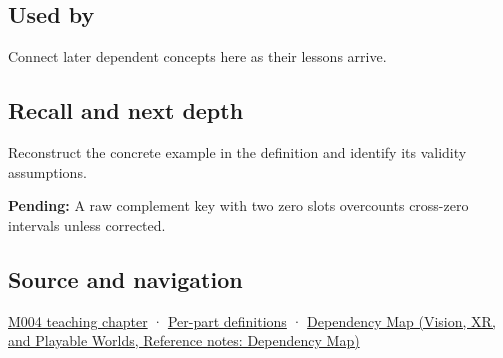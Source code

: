 \subsection{Used by}\label{appendix-deca299ae4b8-used-by}

\hypertarget{appendix-deca299ae4b8-used-by}{}

Connect later dependent concepts here as their lessons arrive.

\subsection{Recall and next depth}\label{appendix-deca299ae4b8-recall-and-next-depth}

\hypertarget{appendix-deca299ae4b8-recall-and-next-depth}{}

Reconstruct the concrete example in the definition and identify its validity assumptions.

\textbf{Pending:} A raw complement key with two zero slots overcounts cross-zero intervals unless corrected.

\subsection{Source and navigation}\label{appendix-deca299ae4b8-source-and-navigation}

\hypertarget{appendix-deca299ae4b8-source-and-navigation}{}

\hyperref[01-foundations-i-ch001-a-stretching-ruler-for-real-valued-quantities]{M004 teaching chapter} · \hyperref[appendix-fd090d982a15-m004---parts-61-76]{Per-part definitions} · \href{../07-Vision-XR-and-Playable-Worlds/main.pdf\#nameddest=appendix-4ad47bdd269a}{Dependency Map (Vision, XR, and Playable Worlds, Reference notes: Dependency Map)}

